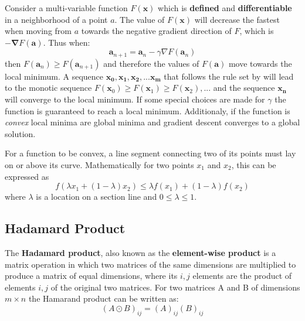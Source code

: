 \begin{definition}
  Consider a multi-variable function $F(\bm{x})$ which is \textbf{defined}
  and \textbf{differentiable} in a neighborhood of a point $a$. The value of
  $F(\bm{x})$ will decrease the fastest when moving from $a$ towards the
  negative gradient direction of $F$, which is $\bm{-\nabla} F(\bm{a})$.
  Thus when:
  \begin{equation}
    \label{eq:grad_simple}
    \bm{a}_{n+1} = \bm{a}_n - \gamma \nabla F(\bm{a}_n)
  \end{equation}
  then $F(\bm{a}_n) \geq F(\bm{a}_{n+1})$ and therefore the values
  of $F(\bm{a})$ move towards the local minimum. A sequence
  $\bm{x_0}, \bm{x_1}, \bm{x_2}, ... \bm{x_m}$ that follows the rule
  set by  will lead to the monotic sequence
  $F(\bm{x}_0) \geq F(\bm{x}_1) \geq F(\bm{x}_2), ...$ and the
  sequence $\bm{x_n}$ will converge to the local minimum.
  If some special choices are made for $\gamma$\footnotemark{} the function is
  guaranteed to reach a local minimum. Additionaly, if the function
  is \textit{convex} local minima are global minima and gradient descent
  converges to a global solution.

  For a function to be convex, a line segment connecting two of its points
  must lay on or above its curve. Mathematically for two points $x_1$ and $x_2$,
  this can be expressed as
  \begin{equation}
    \label{eq:convex_func}
    f(\lambda x_1 + (1 - \lambda)x_2) \leq \lambda f(x_1) + (1-\lambda)f(x_2)
  \end{equation}
  where $\lambda$ is a location on a section line and $0 \leq \lambda \leq 1$.
\end{definition}

\subsection{Hadamard Product}\label{sec:hadamard}
The \textbf{Hadamard product}, also known as the \textbf{element-wise
product} is a matrix operation in which two matrices of the same
dimensions are multiplied to produce a matrix of equal dimensions,
where its $i,j$ elements are the product of elements $i, j$ of the
original two matrices. For two matrices A and B of dimensions $m\times
n$ the Hamarand product can be written as:
\begin{equation}
  \label{eq:hamarand}
  (A \odot B)_{ij} = (A)_{ij}(B)_{ij}
\end{equation}


